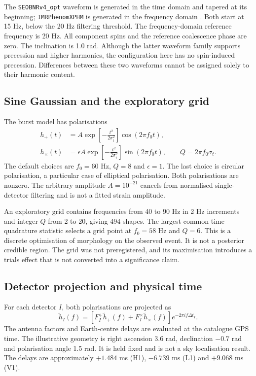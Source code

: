 \documentclass[11pt,a4paper]{article}
\begin{document}
The \texttt{SEOBNRv4\_opt} waveform is generated in the time domain and tapered at its beginning; \texttt{IMRPhenomXPHM} is generated in the frequency domain \cite{seobnr,phenom,pycbc}. Both start at 15 Hz, below the 20 Hz filtering threshold. The frequency-domain reference frequency is 20 Hz. All component spins and the reference coalescence phase are zero. The inclination is 1.0 rad. Although the latter waveform family supports precession and higher harmonics, the configuration here has no spin-induced precession. Differences between these two waveforms cannot be assigned solely to their harmonic content.

\subsection{Sine Gaussian and the exploratory grid}
The burst model has polarisations
\begin{align}
 h_+(t)&=A\exp\left[-\frac{t^2}{2\sigma_t^2}\right]\cos(2\pi f_0t),\\
 h_\times(t)&=\epsilon A\exp\left[-\frac{t^2}{2\sigma_t^2}\right]\sin(2\pi f_0t),
 \qquad Q=2\pi f_0\sigma_t.
\end{align}
The default choices are $f_0=60$ Hz, $Q=8$ and $\epsilon=1$. The last choice is circular polarisation, a particular case of elliptical polarisation. Both polarisations are nonzero. The arbitrary amplitude $A=10^{-21}$ cancels from normalised single-detector filtering and is not a fitted strain amplitude.

An exploratory grid contains frequencies from 40 to 90 Hz in 2 Hz increments and integer $Q$ from 2 to 20, giving 494 shapes. The largest common-time quadrature statistic selects a grid point at $f_0=58$ Hz and $Q=6$. This is a discrete optimisation of morphology on the observed event. It is not a posterior credible region. The grid was not preregistered, and its maximisation introduces a trials effect that is not converted into a significance claim.

\subsection{Detector projection and physical time}
For each detector $I$, both polarisations are projected as
\begin{equation}
 \widetilde h_I(f)=\left[F_I^+\widetilde h_+(f)+F_I^\times\widetilde h_\times(f)\right]
 e^{-2\pi i f\Delta t_I}.
\end{equation}
The antenna factors and Earth-centre delays are evaluated at the catalogue GPS time. The illustrative geometry is right ascension 3.6 rad, declination $-0.7$ rad and polarisation angle 1.5 rad. It is held fixed and is not a sky localisation result. The delays are approximately $+1.484$ ms (H1), $-6.739$ ms (L1) and $+9.068$ ms (V1).
\end{document}
